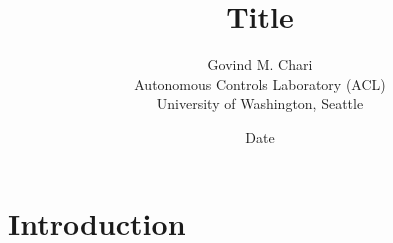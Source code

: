 \documentclass[10pt]{article}
\title{\Large{\textbf{\sffamily Title\\}}\vspace{0.5em}}
\author{Govind M. Chari\\Autonomous Controls Laboratory (ACL)\\University of Washington, Seattle}
\date{Date}
\begin{document}
\maketitle

\tableofcontents

\newpage

\section{Introduction}
\end{document}
